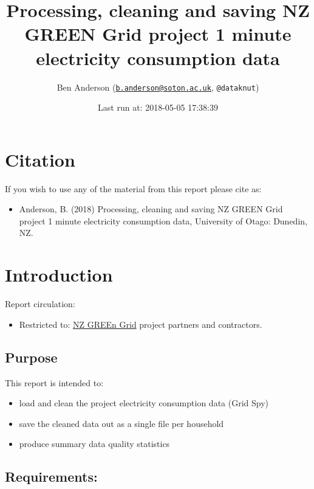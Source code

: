 \documentclass[]{article}
\title{Processing, cleaning and saving NZ GREEN Grid project 1 minute
electricity consumption data}
\author{Ben Anderson
(\href{mailto:b.anderson@soton.ac.uk}{\nolinkurl{b.anderson@soton.ac.uk}},
\texttt{@dataknut})}
\date{Last run at: 2018-05-05 17:38:39}
\providecommand{\tightlist}{%
  \setlength{\itemsep}{0pt}\setlength{\parskip}{0pt}}
\begin{document}
\maketitle

{
\setcounter{tocdepth}{2}
\tableofcontents
}
\newpage

\section{Citation}\label{citation}

If you wish to use any of the material from this report please cite as:

\begin{itemize}
\tightlist
\item
  Anderson, B. (2018) Processing, cleaning and saving NZ GREEN Grid
  project 1 minute electricity consumption data, University of Otago:
  Dunedin, NZ.
\end{itemize}

\newpage

\section{Introduction}\label{introduction}

Report circulation:

\begin{itemize}
\tightlist
\item
  Restricted to:
  \href{https://www.otago.ac.nz/centre-sustainability/research/energy/otago050285.html}{NZ
  GREEn Grid} project partners and contractors.
\end{itemize}

\subsection{Purpose}\label{purpose}

This report is intended to:

\begin{itemize}
\tightlist
\item
  load and clean the project electricity consumption data (Grid Spy)
\item
  save the cleaned data out as a single file per household
\item
  produce summary data quality statistics
\end{itemize}

\subsection{Requirements:}\label{requirements}
\end{document}

